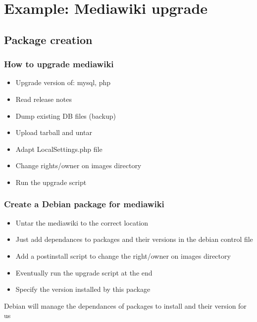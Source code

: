 \documentclass[11pt,compress]{beamer}
\begin{document}
\section{Example: Mediawiki upgrade}
\subsection{Package creation}
\begin{frame}
\frametitle{How to upgrade mediawiki}
\begin{itemize}
\item Upgrade version of: mysql, php
\item Read release notes
\item Dump existing DB files (backup)
\item Upload tarball and untar
\item Adapt LocalSettings.php file
\item Change rights/owner on images directory
\item Run the upgrade script
\end{itemize}
\end{frame}

\begin{frame}
\frametitle{Create a Debian package for mediawiki}
\begin{itemize}
\item Untar the mediawiki to the correct location
\item Just add dependances to packages and their versions in the debian control file
\item Add a postinstall script to change the right/owner on images directory
\item Eventually run the upgrade script at the end
\item Specify the version installed by this package
\end{itemize}
\begin{block}{}
Debian will manage the dependances of packages to install and their version for us
\end{block}
\end{frame}
\end{document}
